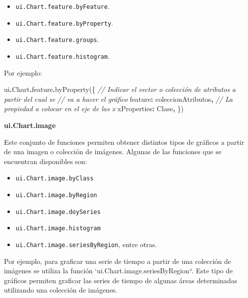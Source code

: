 \documentclass[
  12pt,
  letterpaper,
  twoside]{book}
\newenvironment{Shaded}{\begin{snugshade}}{\end{snugshade}}
\newcommand{\AttributeTok}[1]{\textcolor[rgb]{0.77,0.63,0.00}{#1}}
\newcommand{\CommentTok}[1]{\textcolor[rgb]{0.56,0.35,0.01}{\textit{#1}}}
\newcommand{\DataTypeTok}[1]{\textcolor[rgb]{0.13,0.29,0.53}{#1}}
\newcommand{\FunctionTok}[1]{\textcolor[rgb]{0.00,0.00,0.00}{#1}}
\newcommand{\NormalTok}[1]{#1}
\newcommand{\OperatorTok}[1]{\textcolor[rgb]{0.81,0.36,0.00}{\textbf{#1}}}
\newcommand{\StringTok}[1]{\textcolor[rgb]{0.31,0.60,0.02}{#1}}
\providecommand{\tightlist}{%
  \setlength{\itemsep}{0pt}\setlength{\parskip}{0pt}}
\begin{document}
\begin{itemize}
\tightlist
\item
  \texttt{ui.Chart.feature.byFeature}.
\item
  \texttt{ui.Chart.feature.byProperty}.
\item
  \texttt{ui.Chart.feature.groups}.
\item
  \texttt{ui.Chart.feature.histogram}.
\end{itemize}

Por ejemplo:

\begin{Shaded}
\begin{Highlighting}[]
\NormalTok{ui}\OperatorTok{.}\AttributeTok{Chart}\OperatorTok{.}\AttributeTok{feature}\OperatorTok{.}\FunctionTok{byProperty}\NormalTok{(\{}
  \CommentTok{// Indicar el vector o colección de atributos a partir del cual se }
  \CommentTok{// va a hacer el gráfico}
  \DataTypeTok{feature}\OperatorTok{:}\NormalTok{ coleccionAtributos}\OperatorTok{,} 
  \CommentTok{// La propiedad a colocar en el eje de las x}
  \DataTypeTok{xProperties}\OperatorTok{:} \StringTok{\textquotesingle{}Clase\textquotesingle{}}\OperatorTok{,}
\NormalTok{\})}
\end{Highlighting}
\end{Shaded}

\textbf{ui.Chart.image}

Este conjunto de funciones permiten obtener distintos tipos de gráficos a partir de una imagen o colección de imágenes. Algunas de las funciones que se encuentran disponibles son:

\begin{itemize}
\tightlist
\item
  \texttt{ui.Chart.image.byClass}
\item
  \texttt{ui.Chart.image.byRegion}
\item
  \texttt{ui.Chart.image.doySeries}
\item
  \texttt{ui.Chart.image.histogram}
\item
  \texttt{ui.Chart.image.seriesByRegion}, entre otras.
\end{itemize}

Por ejemplo, para graficar una serie de tiempo a partir de una colección de imágenes se utiliza la función `ui.Chart.image.seriesByRegion``. Este tipo de gráficos permiten graficar las series de tiempo de algunas áreas determinadas utilizando una colección de imágenes.
\end{document}
